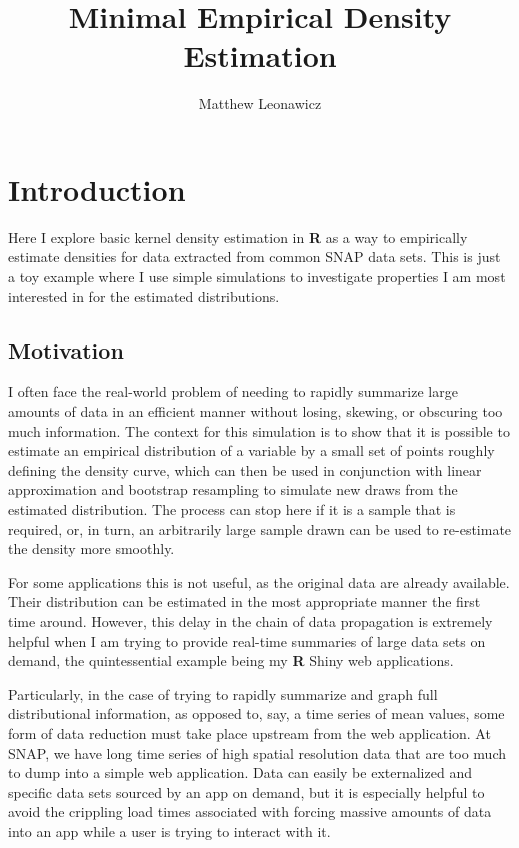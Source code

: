 \documentclass{article}\usepackage[]{graphicx}\usepackage[]{color}
\begin{document}
\title{Minimal Empirical Density Estimation}
\author{Matthew Leonawicz}
\maketitle



\section{Introduction}
Here I explore basic kernel density estimation in \textbf{R} as a way to empirically estimate densities for data extracted from common SNAP data sets.
This is just a toy example where I use simple simulations to investigate properties I am most interested in for the estimated distributions.

\subsection{Motivation}
I often face the real-world problem of needing to rapidly summarize large amounts of data in an efficient manner without losing, skewing, or obscuring too much information.
The context for this simulation is to show that it is possible to estimate an empirical distribution of a variable by a small set of points roughly defining the density curve,
which can then be used in conjunction with linear approximation and bootstrap resampling to simulate new draws from the estimated distribution.
The process can stop here if it is a sample that is required, or, in turn, an arbitrarily large sample drawn can be used to re-estimate the density more smoothly.

For some applications this is not useful, as the original data are already available.
Their distribution can be estimated in the most appropriate manner the first time around.
However, this delay in the chain of data propagation is extremely helpful when I am trying to provide real-time summaries of large data sets on demand,
the quintessential example being my \textbf{R} Shiny web applications.

Particularly, in the case of trying to rapidly summarize and graph full distributional information, as opposed to, say, a time series of mean values,
some form of data reduction must take place upstream from the web application.
At SNAP, we have long time series of high spatial resolution data that are too much to dump into a simple web application.
Data can easily be externalized and specific data sets sourced by an app on demand,
but it is especially helpful to avoid the crippling load times associated with forcing massive amounts of data into an app while a user is trying to interact with it.
\end{document}
